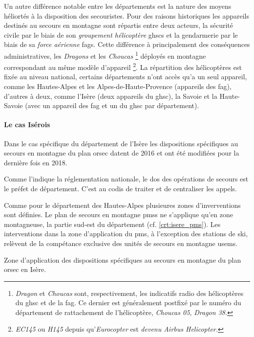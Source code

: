 Un autre différence notable entre les départements est la nature des
moyens héliortés à la disposition des secouristes. Pour des raisons
historiques les appareils destinés au secours en montagne sont
répartis entre deux acteurs, la sécurité civile par le biais de son
\emph{groupement hélicoptère} \acp{ghsc} et la gendarmerie par le
biais de sa \emph{force aérienne} \acp{fag}. Cette différence à
principalement des conséquences administratives, les \emph{Dragons} et
les \emph{Choucas} \footnote{\emph{Dragon} et \emph{Choucas} sont,
  respectivement, les indicatifs radio des hélicoptères du \ac{ghsc}
  et de la \ac{fag}. Ce dernier est généralement postfixé par le
  numéro du département de rattachement de l'hélicoptère, \eg
  \emph{Choucas 05,} \emph{Dragon 38.}} déployés en montagne
correspondant au même modèle d'appareil \footnote{\emph{EC145} ou
  \emph{H145} depuis qu'\emph{Eurocopter} est \emph{devenu Airbus
    Helicopter.}}. La répartition des hélicoptères est fixée au niveau
national, certains départements n'ont accès qu'a un seul appareil,
comme les Hautes-Alpes et les Alpes-de-Haute-Provence (appareils des
\ac{fag}), d'autres à deux, comme l'Isère (deux appareils du
\ac{ghsc}), la Savoie et la Haute-Savoie (avec un appareil des
\ac{fag} et un du \ac{ghsc} par département).

\paragraph{Le cas Isérois}

Dans le cas spécifique du département de l'Isère les dispositions
spécifiques au secours en montagne du plan \ac{orsec} datent de 2016
et ont été modifiées pour la dernière fois en 2018.

Comme l'indique la réglementation nationale, le \ac{dos} des
opérations de secours est le préfet de département.  C'est au
\ac{codis} de traiter et de centraliser les appels.

Comme pour le département des Hautes-Alpes plusieures zones
d'inverventions sont définies. Le plan de secours en montagne
\acp{pms} ne s'applique qu'en zone montagneuse, \ie la partie sud-est
du département (cf. \autoref{crt:isere_pms}). Les interventions dans
la zone d'application du \ac{pms}, à l'exception des stations de ski,
relèvent de la compétance exclusive des unités de secours en montagne
\acp{usem}.

\begin{carte}
  \centering
  \caption{Zone d'application des dispositions spécifiques au secours
    en montagne du plan \ac{orsec} en Isère.}
  \label{crt:isere_pms}
\end{carte}

